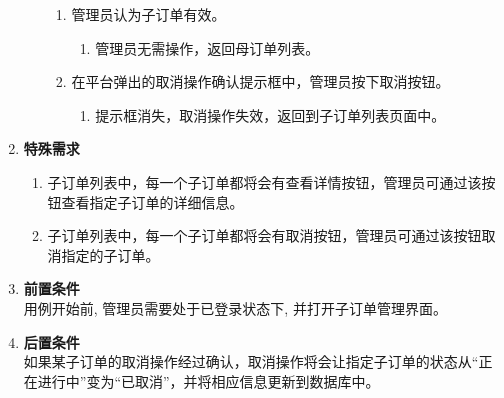 \begin{enumerate}
\begin{enumerate}
\begin{enumerate}
            \item 管理员认为子订单有效。
            \begin{enumerate}
                \item 管理员无需操作，返回母订单列表。
            \end{enumerate}
            \item 在平台弹出的取消操作确认提示框中，管理员按下取消按钮。
            \begin{enumerate}
                \item 提示框消失，取消操作失效，返回到子订单列表页面中。
            \end{enumerate}
        \end{enumerate}
    \end{enumerate}
    \item \textbf{特殊需求}
    \begin{enumerate}
        \item 子订单列表中，每一个子订单都将会有查看详情按钮，管理员可通过该按钮查看指定子订单的详细信息。
        \item 子订单列表中，每一个子订单都将会有取消按钮，管理员可通过该按钮取消指定的子订单。
    \end{enumerate}
    \item \textbf{前置条件} \\ 用例开始前, 管理员需要处于已登录状态下, 并打开子订单管理界面。
    \item \textbf{后置条件} \\ 如果某子订单的取消操作经过确认，取消操作将会让指定子订单的状态从“正在进行中”变为“已取消”，并将相应信息更新到数据库中。
\end{enumerate}

